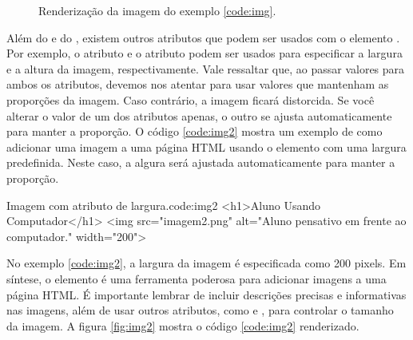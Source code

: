 \begin{figure}[ht!]    
    \caption{Renderização da imagem do exemplo \ref{code:img}.}
    \label{fig:img}
\end{figure}

Além do  e do , existem outros atributos que podem ser usados com o elemento . Por exemplo, o atributo  e o atributo  podem ser usados para especificar a largura e a altura da imagem, respectivamente. Vale ressaltar que, ao passar valores para ambos os atributos, devemos nos atentar para usar valores que mantenham as proporções da imagem. Caso contrário, a imagem ficará distorcida. Se você alterar o valor de um dos atributos apenas, o outro se ajusta automaticamente para manter a proporção. O código \ref{code:img2} mostra um exemplo de como adicionar uma imagem a uma página HTML usando o elemento  com uma largura predefinida. Neste caso, a algura será ajustada automaticamente para manter a proporção.

\begin{htmlcode}{Imagem com atributo de largura.}{code:img2}
<h1>Aluno Usando Computador</h1>
<img src="imagem2.png" alt="Aluno pensativo em frente ao computador." width="200">
\end{htmlcode}

No exemplo \ref{code:img2}, a largura da imagem é especificada como 200 pixels. Em síntese, o elemento  é uma ferramenta poderosa para adicionar imagens a uma página HTML. É importante lembrar de incluir descrições precisas e informativas nas imagens, além de usar outros atributos, como  e , para controlar o tamanho da imagem. A figura \ref{fig:img2} mostra o código \ref{code:img2} renderizado.

